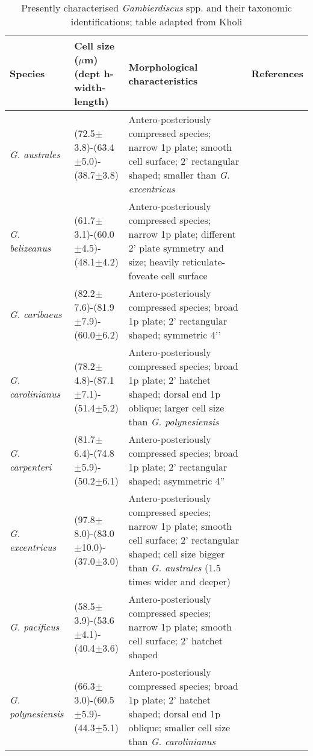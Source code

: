\documentclass[12pt]{article}
\begin{document}
\begin{longtable}{ |  p{1.6cm} | p{3.2cm} | p{6.7cm} |  p{2.5cm} | }
\caption{Presently characterised \emph{Gambierdiscus} spp. and their taxonomic identifications; table adapted from Kholi \cite{kohli2013Gambierdiscus}}\\
\hline
\label{tbl:MorphTable}
\textbf{Species} & \textbf{Cell size ($\mu$m) (dept h-width-length)} & \textbf{Morphological characteristics} & \textbf{References} \\
\hline
 \emph{G. australes} & (72.5$\pm$3.8)-(63.4$\pm$5.0)-(38.7$\pm$3.8) & Antero-posteriously compressed species; narrow 1p plate; smooth cell surface; 2' rectangular shaped; smaller than \emph{G. excentricus} &  \cite{chinain1999morphology,litaker2009taxonomy} \\
\hline
 \emph{G. belizeanus} & (61.7$\pm$3.1)-(60.0$\pm$4.5)-(48.1$\pm$4.2) & Antero-posteriously compressed species; narrow 1p plate; different 2' plate symmetry and size; heavily reticulate-foveate cell surface & \cite{litaker2009taxonomy,faust1995observation} \\
\hline
 \emph{G. caribaeus} & (82.2$\pm$7.6)-(81.9$\pm$7.9)-(60.0$\pm$6.2) & Antero-posteriously compressed species; broad 1p plate; 2’ rectangular shaped; symmetric 4’’  & \cite{litaker2009taxonomy} \\
\hline
 \emph{G. carolinianus} & (78.2$\pm$4.8)-(87.1$\pm$7.1)-(51.4$\pm$5.2) & Antero-posteriously compressed species; broad 1p plate; 2’ hatchet shaped; dorsal end 1p oblique; larger cell size than \emph{G. polynesiensis}  & \cite{litaker2009taxonomy} \\
\hline
 \emph{G. carpenteri} & (81.7$\pm$6.4)-(74.8$\pm$5.9)-(50.2$\pm$6.1) & Antero-posteriously compressed species; broad 1p plate; 2’ rectangular shaped; asymmetric 4''   & \cite{litaker2009taxonomy} \\
\hline
  \emph{G. excentricus} & (97.8$\pm$8.0)-(83.0$\pm$10.0)-(37.0$\pm$3.0) & Antero-posteriously compressed species; narrow 1p plate; smooth cell surface; 2’ rectangular shaped; cell size bigger than \emph{G. australes} (1.5 times wider and deeper)   & \cite{litaker2009taxonomy} \\
\hline
  \emph{G. pacificus} & (58.5$\pm$3.9)-(53.6$\pm$4.1)-(40.4$\pm$3.6) & Antero-posteriously compressed species; narrow 1p plate; smooth cell surface; 2' hatchet shaped   & \cite{litaker2009taxonomy,chinain1999morphology} \\
\hline
 \emph{G. polynesiensis} & (66.3$\pm$3.0)-(60.5$\pm$5.9)-(44.3$\pm$5.1) & Antero-posteriously compressed species; broad 1p plate; 2’ hatchet shaped; dorsal end 1p oblique; smaller cell size than \emph{G. carolinianus}   & \cite{litaker2009taxonomy,chinain1999morphology} \\

\end{longtable}
\end{document}
